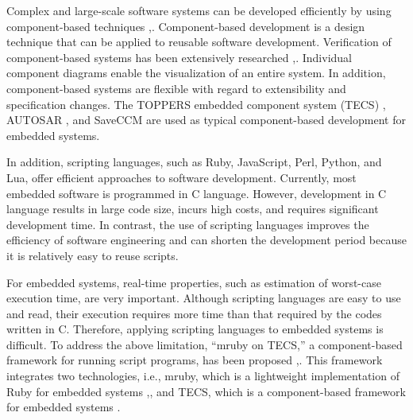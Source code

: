 \documentclass[a4j,12pt,oneside,openany,english]{jsbook}
\begin{document}
Complex and large-scale software systems can be developed efficiently by using component-based techniques \cite{par:Crnkovic},\cite{par:CBD}.
Component-based development is a design technique that can be applied to reusable software development.
Verification of component-based systems has been extensively researched \cite{par:Blaming},\cite{par:Verification}.
Individual component diagrams enable the visualization of an entire system.
In addition, component-based systems are flexible with regard to extensibility and specification changes.
The TOPPERS embedded component system (TECS) \cite{par:TECS}, AUTOSAR \cite{url:AUTOSAR}, and SaveCCM \cite{par:SAVEapproach} are used as typical component-based development for embedded systems.

In addition, scripting languages, such as Ruby, JavaScript, Perl, Python, and Lua, offer efficient approaches to software development.
Currently, most embedded software is programmed in C language.
However, development in C language results in large code size, incurs high costs, and requires significant development time.
In contrast, the use of scripting languages improves the efficiency of software engineering and can shorten the development period because it is relatively easy to reuse scripts. 

For embedded systems, real-time properties, such as estimation of worst-case execution time, are very important.
Although scripting languages are easy to use and read, their execution requires more time than that required by the codes written in C.
Therefore, applying scripting languages to embedded systems is difficult.
To address the above limitation, ``mruby on TECS,'' a component-based framework for running script programs, has been proposed \cite{par:mrubyonTECS},\cite{par:mrubyonTECS3}.
This framework integrates two technologies, i.e., mruby, which is a lightweight implementation of Ruby for embedded systems \cite{par:mruby},\cite{url:mruby}, and TECS, which is a component-based framework for embedded systems \cite{par:TECS}.
\end{document}
